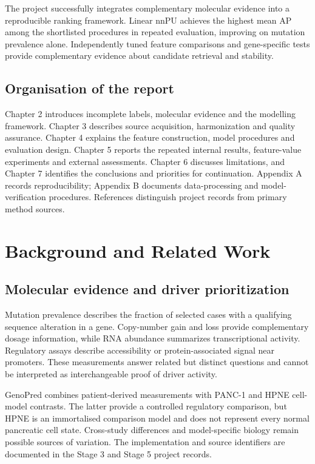 \documentclass[12pt,a4paper,oneside]{report}
\begin{document}
The project successfully integrates complementary molecular evidence into a reproducible ranking framework. Linear nnPU achieves the highest mean AP among the shortlisted procedures in repeated evaluation, improving on mutation prevalence alone. Independently tuned feature comparisons and gene-specific tests provide complementary evidence about candidate retrieval and stability.

\section{Organisation of the report}
Chapter 2 introduces incomplete labels, molecular evidence and the modelling framework. Chapter 3 describes source acquisition, harmonization and quality assurance. Chapter 4 explains the feature construction, model procedures and evaluation design. Chapter 5 reports the repeated internal results, feature-value experiments and external assessments. Chapter 6 discusses limitations, and Chapter 7 identifies the conclusions and priorities for continuation. Appendix A records reproducibility; Appendix B documents data-processing and model-verification procedures. References distinguish project records from primary method sources.

\chapter{Background and Related Work}
\section{Molecular evidence and driver prioritization}
Mutation prevalence describes the fraction of selected cases with a qualifying sequence alteration in a gene. Copy-number gain and loss provide complementary dosage information, while RNA abundance summarizes transcriptional activity. Regulatory assays describe accessibility or protein-associated signal near promoters. These measurements answer related but distinct questions and cannot be interpreted as interchangeable proof of driver activity.

GenoPred combines patient-derived measurements with PANC-1 and HPNE cell-model contrasts. The latter provide a controlled regulatory comparison, but HPNE is an immortalised comparison model and does not represent every normal pancreatic cell state. Cross-study differences and model-specific biology remain possible sources of variation. The implementation and source identifiers are documented in the Stage 3 and Stage 5 project records.
\end{document}
